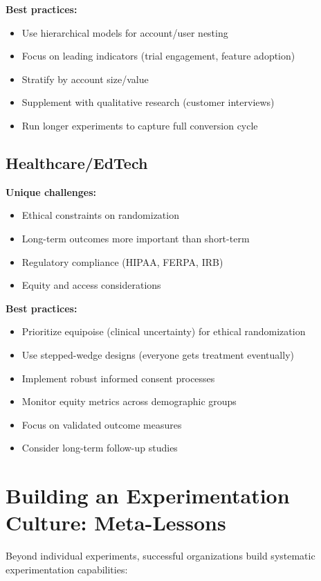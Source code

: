 \textbf{Best practices:}
\begin{itemize}
    \item Use hierarchical models for account/user nesting
    \item Focus on leading indicators (trial engagement, feature adoption)
    \item Stratify by account size/value
    \item Supplement with qualitative research (customer interviews)
    \item Run longer experiments to capture full conversion cycle
\end{itemize}

\subsection{Healthcare/EdTech}

\textbf{Unique challenges:}
\begin{itemize}
    \item Ethical constraints on randomization
    \item Long-term outcomes more important than short-term
    \item Regulatory compliance (HIPAA, FERPA, IRB)
    \item Equity and access considerations
\end{itemize}

\textbf{Best practices:}
\begin{itemize}
    \item Prioritize equipoise (clinical uncertainty) for ethical randomization
    \item Use stepped-wedge designs (everyone gets treatment eventually)
    \item Implement robust informed consent processes
    \item Monitor equity metrics across demographic groups
    \item Focus on validated outcome measures
    \item Consider long-term follow-up studies
\end{itemize}

\section{Building an Experimentation Culture: Meta-Lessons}

Beyond individual experiments, successful organizations build systematic experimentation capabilities:

